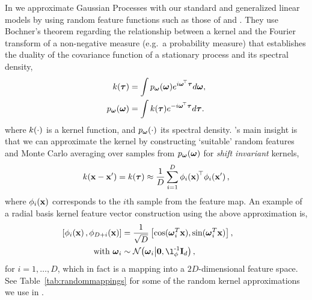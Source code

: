 \documentclass[11pt, oneside]{article}
\begin{document}
In \revrand{} we approximate Gaussian Processes \citep{Rasmussen2006} with
our standard and generalized linear models by using random feature functions
such as those of \citeauthor{rahimi2007} \citeyearpar{rahimi2007,rahimi2008}
and \cite{le2013fastfood}. They use Bochner's theorem regarding the
relationship between a kernel and the Fourier transform of a non-negative
measure (e.g.~a probability measure) that establishes the duality of the
covariance function of a stationary process and its spectral density,
\begin{align}
	k(\boldsymbol{\tau}) &= \int p_{\boldsymbol{\omega}}(\boldsymbol{\omega}) 
    e^{i \boldsymbol{\omega}^{\!\top}  \boldsymbol{\tau}} d \boldsymbol{\omega},  \\
	p_{\boldsymbol{\omega}}(\boldsymbol{\omega}) &= \int k(\boldsymbol{\tau}) 
    e^{- i \boldsymbol{\omega}^{\!\top} \boldsymbol{\tau}}  d \boldsymbol{\tau}.
	\label{eq:fourier}
\end{align}
where $k(\cdot)$ is a kernel function, and $p_{\boldsymbol{\omega}}(\cdot)$ its
spectral density. \citeauthor{rahimi2007}'s  main insight
\citeyearpar{rahimi2007} is that we can approximate the kernel by constructing
`suitable' random features and Monte Carlo averaging over samples from
$p_{\boldsymbol{\omega}}(\boldsymbol{\omega})$ for \emph{shift invariant} kernels,
\begin{equation}
    k(\mathbf{x} - \mathbf{x}') = k(\boldsymbol{\tau}) 
    \approx \frac{1}{D} \sum_{i=1}^{D} \phi_{i}\!\left({{\mathbf{x}}}\right)^{\!\top}\!
	\phi_{i}\!\left({{\mathbf{x}'}}\right),
	\label{eq:mcapprox}
\end{equation}
where $\phi_{i}\!\left({{\mathbf{x}}}\right)$ corresponds to the $i$th sample from the
feature map. An example of a radial basis kernel feature vector construction
using the above approximation is,
\begin{align}
	\nonumber
    \sbrac{\singlefeatfunc{\inss}{i}, \singlefeatfunc{\inss}{D+i}}&= 
    \frac{1}{\sqrt{D}} \sbrac{\cos(\ffourier_i^T \inss), 
    \sin(\ffourier_i^T \inss)}, \qquad \\
    \text{with}~\ffourier_i & \sim 
    \gausC{\ffourier_i}{\mathbf{0}, \lenscale\inv \ident{d}},
\end{align}
for $i=1, \ldots, D$,  which in fact is a mapping into a $2 D$-dimensional
feature space. See Table~\ref{tab:randommappings} for some of the random kernel
approximations we use in \revrand{}.
\end{document}
